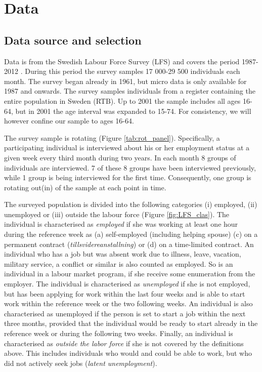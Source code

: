 \section{Data}
\label{sec:data}

\subsection{Data source and selection}
Data is from the Swedish Labour Force Survey (LFS) and covers the period 1987-2012 \citep{AKU2012}. During this period the survey samples 17 000-29 500 individuals each month. The survey began already in 1961, but micro data is only available for 1987 and onwards. The survey samples individuals from a register containing the entire population in Sweden (RTB). Up to 2001 the sample includes all ages 16-64, but in 2001 the age interval was expanded to 15-74. For consistency, we will however confine our sample to ages 16-64. 

The survey sample is rotating (Figure \ref{tab:rot_panel}). Specifically, a participating individual is interviewed about his or her employment status at a given week every third month during two years. In each month 8 groups of individuals are interviewed. 7 of these 8 groups have been interviewed previously, while 1 group is being interviewed for the first time. Consequently, one group is rotating out(in) of the sample at each point in time.

The surveyed population is divided into the following categories (i) employed, (ii) unemployed or (iii) outside the labour force (Figure \ref{fig:LFS_clas}). The individual is characterised as \textit{employed} if she was working at least one hour during the reference week as (a) self-employed (including helping spouse) (c) on a permanent contract (\textit{tillsvidereanstallning}) or (d) on a time-limited contract. An individual who has a job but was absent work due to illness, leave, vacation, military service, a conflict or similar is also counted as employed. So is an individual in a labour market program, if she receive some enumeration from the employer. The individual is characterised as \textit{unemployed} if she is not employed, but has been applying for work within the last four weeks and is able to start work within the reference week or the two following weeks. An individual is also characterised as unemployed if the person is set to start a job within the next three months, provided that the individual would be ready to start already in the reference week or during the following two weeks. Finally, an individual is characterised as \emph{outside the labor force} if she is not covered by the definitions above. This includes individuals who would and could be able to work, but who did not actively seek jobs (\textit{latent unemployment}). 

